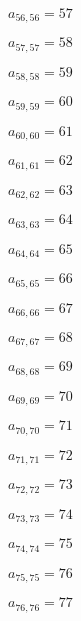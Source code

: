 \documentclass[a4paper,12pt]{article}
\begin{document}
$a _{ 56, 56 } = 57$

$a _{ 57, 57 } = 58$

$a _{ 58, 58 } = 59$

$a _{ 59, 59 } = 60$

$a _{ 60, 60 } = 61$

$a _{ 61, 61 } = 62$

$a _{ 62, 62 } = 63$

$a _{ 63, 63 } = 64$

$a _{ 64, 64 } = 65$

$a _{ 65, 65 } = 66$

$a _{ 66, 66 } = 67$

$a _{ 67, 67 } = 68$

$a _{ 68, 68 } = 69$

$a _{ 69, 69 } = 70$

$a _{ 70, 70 } = 71$

$a _{ 71, 71 } = 72$

$a _{ 72, 72 } = 73$

$a _{ 73, 73 } = 74$

$a _{ 74, 74 } = 75$

$a _{ 75, 75 } = 76$

$a _{ 76, 76 } = 77$
\end{document}
